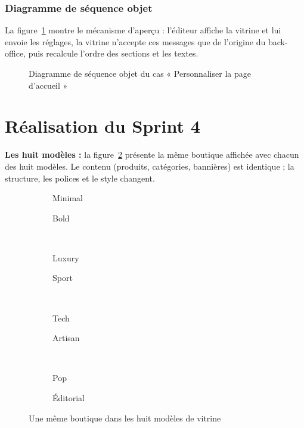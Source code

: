 \subsubsection{Diagramme de séquence objet}
La figure~\ref{fig:dso-theme} montre le mécanisme d'aperçu : l'éditeur affiche la vitrine et lui envoie les réglages, la vitrine n'accepte ces messages que de l'origine du back-office, puis recalcule l'ordre des sections et les textes.
\begin{figure}[H]
    \centering
    \caption{Diagramme de séquence objet du cas « Personnaliser la page d'accueil »}
    \label{fig:dso-theme}
\end{figure}

\section{Réalisation du Sprint 4}
\textbf{Les huit modèles :} la figure~\ref{fig:ui-modeles} présente la même boutique affichée avec chacun des huit modèles. Le contenu (produits, catégories, bannières) est identique ; la structure, les polices et le style changent.
\begin{figure}[H]
    \centering
    \begin{subfigure}{0.48\textwidth}\centering{}\caption{Minimal}\end{subfigure}\hfill
    \begin{subfigure}{0.48\textwidth}\centering{}\caption{Bold}\end{subfigure}\\[4pt]
    \begin{subfigure}{0.48\textwidth}\centering{}\caption{Luxury}\end{subfigure}\hfill
    \begin{subfigure}{0.48\textwidth}\centering{}\caption{Sport}\end{subfigure}\\[4pt]
    \begin{subfigure}{0.48\textwidth}\centering{}\caption{Tech}\end{subfigure}\hfill
    \begin{subfigure}{0.48\textwidth}\centering{}\caption{Artisan}\end{subfigure}\\[4pt]
    \begin{subfigure}{0.48\textwidth}\centering{}\caption{Pop}\end{subfigure}\hfill
    \begin{subfigure}{0.48\textwidth}\centering{}\caption{Éditorial}\end{subfigure}
    \caption{Une même boutique dans les huit modèles de vitrine}
    \label{fig:ui-modeles}
\end{figure}

